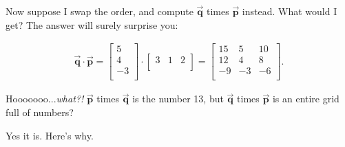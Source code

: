Now suppose I swap the order, and compute $\overrightarrow{\textbf{q}}$ times
$\overrightarrow{\textbf{p}}$ instead. What would I get? The answer will surely
surprise you:

\vspace{-.15in}
\begin{align*}
\overrightarrow{\textbf{q}} \cdot \overrightarrow{\textbf{p}} =
\begin{bmatrix}
5 \\ 4 \\ -3 \\
\end{bmatrix} \cdot
\begin{bmatrix}
3 & 1 & 2 \\
\end{bmatrix} =
\begin{bmatrix}
15 & 5 & 10 \\
12 & 4 & 8 \\
-9 & -3 & -6 \\
\end{bmatrix}.
\end{align*}
\vspace{-.15in}

Hooooooo...\textit{what?!} $\overrightarrow{\textbf{p}}$ times
$\overrightarrow{\textbf{q}}$ is the number 13, but
$\overrightarrow{\textbf{q}}$ times $\overrightarrow{\textbf{p}}$ is an entire
grid full of numbers?

Yes it is. Here's why. 




